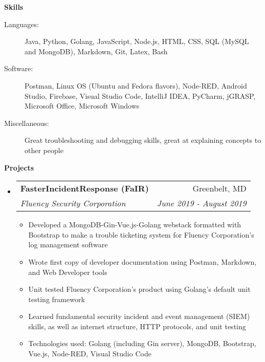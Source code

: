 \documentclass[letterpaper,11pt]{article}
\makeatletter
\newcommand{\resitem}[1]{\item #1 \vspace{-2pt}}
\newcommand{\resheading}[1]{{\large \colorbox{mygrey}{\begin{minipage}{\textwidth}{\textbf{#1 \vphantom{p\^{E}}}}\end{minipage}}}}
\newcommand{\ressubheading}[4]{
\begin{tabular*}{7.0in}{l@{\extracolsep{\fill}}r}
		\textbf{#1} & #2 \\
		\textit{#3} & \textit{#4} \\
\end{tabular*}\vspace{-6pt}}
\makeatother
\begin{document}
\resheading{Skills}

\begin{description}
\item[Languages:]
Java, Python, Golang, JavaScript, Node.js, HTML, CSS, SQL (MySQL and MongoDB), Markdown, Git, Latex, Bash
\item[Software:]
Postman, Linux OS (Ubuntu and Fedora flavors), Node-RED, Android Studio, Firebase, Visual Studio Code, IntelliJ IDEA, PyCharm, jGRASP, Microsoft Office, Microsoft Windows
\item[Miscellaneous:]
Great troubleshooting and debugging skills, great at explaining concepts to other people
\end{description}

\resheading{Projects}

\begin{itemize}
\item
    \ressubheading{FasterIncidentResponse (FaIR)}{Greenbelt, MD}{Fluency Security Corporation}{June 2019 - August 2019}
	\begin{itemize}
		\resitem{Developed a MongoDB-Gin-Vue.js-Golang webstack formatted with Bootstrap to make a trouble ticketing system for Fluency Corporation's log management software}
		\resitem{Wrote first copy of developer documentation using Postman, Markdown, and Web Developer tools}
		\resitem{Unit tested Fluency Corporation's product using Golang's default unit testing framework}
		\resitem{Learned fundamental security incident and event management (SIEM) skills, as well as internet structure, HTTP protocols, and unit testing}
		\resitem{Technologies used: Golang (including Gin server), MongoDB, Bootstrap, Vue.js, Node-RED, Visual Studio Code}
	\end{itemize}

\end{itemize}
\end{document}
